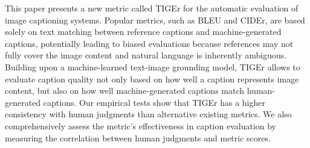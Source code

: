 This paper presents a new metric called TIGEr for the automatic evaluation of image captioning systems. Popular metrics, such as BLEU and CIDEr, are based solely on text matching between reference captions and machine-generated captions, potentially leading to biased evaluations because references may not fully cover the image content and natural language is inherently ambiguous. Building upon a machine-learned text-image grounding model, TIGEr allows to evaluate caption quality not only based on how well a caption represents image content, but also on how well machine-generated captions match human-generated captions. Our empirical tests show that TIGEr has a higher consistency with human judgments than alternative existing metrics. We also comprehensively assess the metric's effectiveness in caption evaluation by measuring the correlation between human judgments and metric scores.